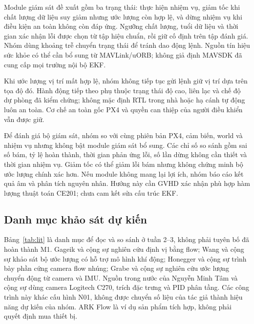 \documentclass[a4paper,12pt]{article}
\begin{document}
Module giám sát đề xuất gồm ba trạng thái: thực hiện nhiệm vụ, giảm tốc khi chất lượng dữ liệu suy giảm nhưng ước lượng còn hợp lệ, và dừng nhiệm vụ khi điều kiện an toàn không còn đáp ứng. Ngưỡng chất lượng, tuổi dữ liệu và thời gian xác nhận lỗi được chọn từ tập hiệu chuẩn, rồi giữ cố định trên tập đánh giá. Nhóm dùng khoảng trễ chuyển trạng thái để tránh dao động lệnh. Nguồn tín hiệu sức khỏe có thể cần bổ sung từ MAVLink/uORB; không giả định MAVSDK đã cung cấp mọi trường nội bộ EKF.

Khi ước lượng vị trí mất hợp lệ, nhóm không tiếp tục gửi lệnh giữ vị trí dựa trên tọa độ đó. Hành động tiếp theo phụ thuộc trạng thái độ cao, liên lạc và chế độ dự phòng đã kiểm chứng; không mặc định RTL trong nhà hoặc hạ cánh tự động luôn an toàn. Cơ chế an toàn gốc PX4 và quyền can thiệp của người điều khiển vẫn được giữ.

Để đánh giá bộ giám sát, nhóm so với cùng phiên bản PX4, cảm biến, world và nhiệm vụ nhưng không bật module giám sát bổ sung. Các chỉ số so sánh gồm sai số bám, tỷ lệ hoàn thành, thời gian phản ứng lỗi, số lần dừng không cần thiết và thời gian nhiệm vụ. Giảm tốc có thể giảm lỗi bám nhưng không chứng minh bộ ước lượng chính xác hơn. Nếu module không mang lại lợi ích, nhóm báo cáo kết quả âm và phân tích nguyên nhân. Hướng này cần GVHD xác nhận phù hợp hàm lượng thuật toán CE201; chưa cam kết sửa cấu trúc EKF.

\subsection{Danh mục khảo sát dự kiến}
Bảng~\ref{tab:lit} là danh mục để đọc và so sánh ở tuần 2--3, không phải tuyên bố đã hoàn thành M1. Gageik và cộng sự nghiên cứu định vị bằng flow\cite{gageik}; Wang và cộng sự khảo sát bộ ước lượng có hỗ trợ mô hình khí động\cite{wang}; Honegger và cộng sự trình bày phần cứng camera flow nhúng\cite{honegger}; Grabe và cộng sự nghiên cứu ước lượng chuyển động từ camera và IMU\cite{grabe}. Nguồn trong nước của Nguyễn Minh Tâm và cộng sự dùng camera Logitech C270, trích đặc trưng và PID phân tầng\cite{vn}. Các công trình này khác cấu hình N01, không được chuyển số liệu của tác giả thành hiệu năng dự kiến của nhóm. ARK Flow là ví dụ sản phẩm tích hợp, không phải quyết định mua thiết bị\cite{ark}.
\end{document}
